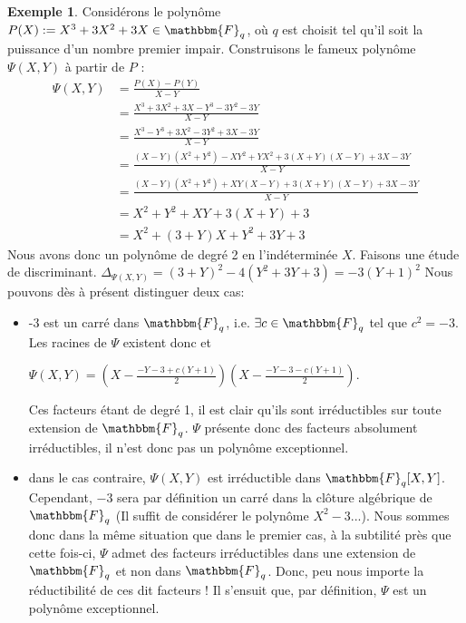 \documentclass[12pt]{article}
\theoremstyle{remark}\newtheorem{note}{Note}
\theoremstyle{remark}\newtheorem{nota}{Notation}
\newcommand{\Fq}{\mathbbm{F}_q}
\theoremstyle{definition}
\newtheorem{example}{Exemple}
\begin{document}
\begin{example}
Considérons le polynôme $P(X) := X^3 +3X^2 + 3X \in \Fq$, où $q$ est choisit tel qu'il soit la puissance d'un nombre premier impair. \newline
Construisons le fameux polynôme $\Psi(X,Y)$ à partir de $P$ :
	\begin{align*}
\Psi(X,Y) &= \displaystyle\frac{P(X) - P(Y)}{X-Y} \\
&= \displaystyle\frac{X^3 + 3X^2 + 3X - Y^3 - 3Y^2 - 3Y}{X -Y} \\
&= \displaystyle\frac{X^3 - Y^3 + 3X^2 - 3Y^2 + 3X - 3Y}{X -Y} \\
&= \displaystyle\frac{(X-Y)(X^2+Y^2) - XY^2 + YX^2 + 3(X+Y)(X-Y) +3X - 3Y}{X -Y} \\
&= \displaystyle\frac{(X-Y)(X^2+Y^2) + XY(X-Y) + 3(X+Y)(X-Y) +3X - 3Y}{X -Y} \\
&= \displaystyle X^2+Y^2 +XY+ 3(X+Y) +3\\
&= X^2 + (3+Y)X + Y^2 + 3Y + 3
	\end{align*}
Nous avons donc un polynôme de degré 2 en l'indéterminée $X$. Faisons une étude de discriminant. \newline
$\Delta_{\Psi(X,Y)} = (3+Y)^2 - 4(Y^2 + 3Y + 3) = -3(Y+1)^2$ \newline 
Nous pouvons dès à présent distinguer deux cas: 
	\begin{itemize}
		\item -3 est un carré dans $\Fq$, i.e. $\exists c\in \Fq$ tel que $c^2 = -3$. Les racines de $\Psi$ existent donc et 
			\begin{center} $\Psi(X,Y) = (\displaystyle X - \frac{-Y -3 + c(Y+1)}{2})( X - \frac{-Y -3 - c(Y+1)}{2})$.\end{center}
Ces facteurs étant de degré 1, il est clair qu'ils sont irréductibles sur toute extension de $\Fq$. $\Psi$ présente donc des facteurs absolument irréductibles, il n'est donc pas un polynôme exceptionnel.
		\item dans le cas contraire, $\Psi(X,Y)$ est irréductible dans $\Fq[X,Y]$. Cependant, $-3$ sera par définition un carré dans la clôture algébrique de $\Fq$ (Il suffit de considérer le polynôme $X^2 - 3$...). Nous sommes donc dans la même situation que dans le premier cas, à la subtilité près que cette fois-ci, $\Psi$ admet des facteurs irréductibles dans une extension de $\Fq$ et non dans $\Fq$. Donc, peu nous importe la réductibilité de ces dit facteurs ! Il s'ensuit que, par définition, $\Psi$ est un polynôme exceptionnel.
		\end{itemize}
\end{example}
\end{document}
